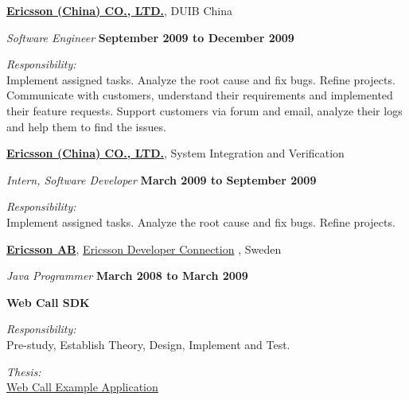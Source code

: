 \href{http://www.ericsson.com/cn}{\textbf{Ericsson (China) CO., LTD.}}, {DUIB China}
\begin{outerlist}
\item[] \textit{Software Engineer}%
        \hfill \textbf{September 2009 to December 2009}
\begin{outerlist}
\item \textit{Responsibility:}\\
Implement assigned tasks. Analyze the root cause and fix bugs.
Refine projects. Communicate with customers, understand their requirements and implemented their feature requests. Support customers via forum and email, analyze their logs and help them to find the issues.
\end{outerlist}
\end{outerlist}
\blankline

%
\href{http://www.ericsson.com/cn}{\textbf{Ericsson (China) CO., LTD.}}, {System Integration and Verification}
\begin{outerlist}

\item[] \textit{Intern, Software Developer}%
        \hfill \textbf{March 2009 to September 2009}
\begin{outerlist}
\item \textit{Responsibility:}\\
Implement assigned tasks. Analyze the root cause and fix bugs.
Refine projects.
\end{outerlist}
\end{outerlist}
\blankline

%
\href{http://www.ericsson.com/}{\textbf{Ericsson AB}}, \href{http://www.ericsson.com/developer}{Ericsson Developer Connection} ,
Sweden
\begin{outerlist}

\item[] \textit{Java Programmer}%
        \hfill \textbf{March 2008 to March 2009}

\item[] {\textbf{Web Call SDK}}
\begin{outerlist}
\item \textit{Responsibility:}\\
Pre-study, Establish Theory, Design, Implement and Test. 
\item \textit{Thesis:}\\
\href{http://shanbohomepage.googlecode.com/hg/master_thesis/master_thesis.pdf}{Web Call Example Application}
\end{outerlist}
\end{outerlist}
\blankline



